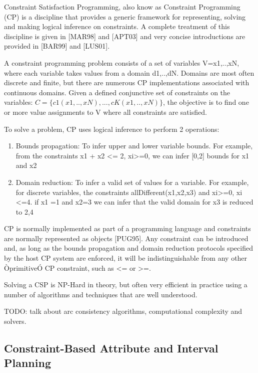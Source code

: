 Constraint Satisfaction Programming, also know as Constraint Programming (CP) is a discipline that provides a generic framework for representing, solving and making logical inference on constraints. A complete treatment of this discipline is given in [MAR98] and [APT03] and very concise introductions are provided in [BAR99] and [LUS01]. 

	A constraint programming problem consists of a set of variables V={x1,..,xN}, where each variable takes values from a domain d1,..,dN. Domains are most often discrete and finite, but there are numerous CP implementations associated with continuous domains. Given a defined conjunctive set of constraints on the variables: $C=\{c1(x1,..,xN), ..., cK(x1,..,xN)\}$, the objective is to find one or more value assignments to V where all constraints are satisfied.

To solve a problem, CP uses logical inference to perform 2 operations:

\begin{enumerate}
	\item Bounds propagation: To infer upper and lower variable bounds. For example, from the constraints x1 + x2 <= 2, xi>=0, we can infer [0,2] bounds for x1 and x2

	\item Domain reduction: To infer a valid set of values for a variable. For example, for discrete variables, the constraints allDifferent(x1,x2,x3) and xi>=0, xi <=4. if x1 =1 and x2=3 we can infer that the valid domain for x3 is reduced to {2,4} 

\end{enumerate}

CP is normally implemented as part of a programming language and constraints are normally represented as objects [PUG95]. Any constraint can be introduced and, as long as the bounds propagation and domain reduction protocols specified by the host CP system are enforced, it will be indistinguishable from any other ÒprimitiveÓ CP constraint, such as <= or >=.

Solving a CSP is NP-Hard in theory, but often very efficient in practice using a number of algorithms and techniques that are well understood.

TODO: talk about arc consistency algorithms, computational complexity and solvers.


\subsection{Constraint-Based Attribute and Interval Planning}
\label{sec:europa:cp}


